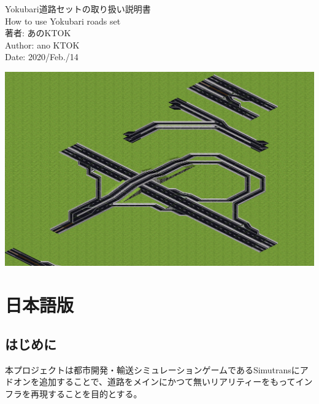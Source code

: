 \documentclass{jbook}
\begin{document}
\thispagestyle{empty}

\begin{flushleft}

  { \fontsize{24pt}{0pt}\selectfont
    Yokubari道路セットの取り扱い説明書
  }
	\\
\vspace{3pt}
	{ \fontsize{12pt}{0pt}\selectfont
		How to use Yokubari roads set
	}
	\\
\vspace{15pt}
	{ \fontsize{18pt}{0pt}\selectfont
		著者: あのKTOK
	}
	\\
\vspace{2pt}
	{ \fontsize{12pt}{0pt}\selectfont
		Author: ano KTOK
	}
	\\
\vspace{15pt}
	{ \fontsize{12pt}{0pt}\selectfont
		Date: 2020/Feb./14
	}
\end{flushleft}

\vspace{15pt}
\begin{flushleft}
  \includegraphics[width = 15cm]{picture/20210207app1.png}
\end{flushleft}


\newpage

\renewcommand{\contentsname}{目次 / Index}
\tableofcontents

\newpage

\chapter{日本語版}

\section{はじめに}
本プロジェクトは都市開発・輸送シミュレーションゲームであるSimutransにアドオンを追加することで、道路をメインにかつて無いリアリティーをもってインフラを再現することを目的とする。
\end{document}
